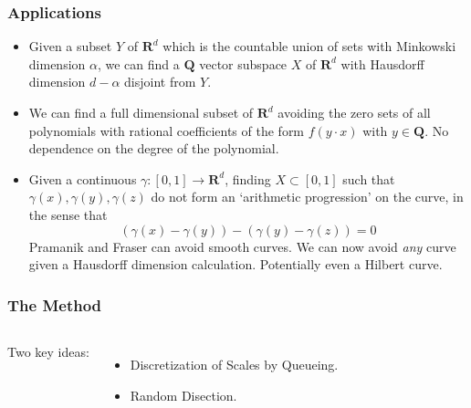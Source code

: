 \documentclass[usenames,dvipsnames]{beamer}
\begin{document}
\begin{frame}
    \frametitle{Applications}

    \begin{itemize}
        \item Given a subset $Y$ of $\mathbf{R}^d$ which is the countable union of sets with Minkowski dimension $\alpha$, we can find a $\mathbf{Q}$ vector subspace $X$ of $\mathbf{R}^d$ with Hausdorff dimension $d - \alpha$ disjoint from $Y$.

        \item We can find a full dimensional subset of $\mathbf{R}^d$ avoiding the zero sets of all polynomials with rational coefficients of the form $f(y \cdot x)$ with $y \in \mathbf{Q}$. No dependence on the degree of the polynomial.

        \item Given a continuous $\gamma: [0,1] \to \mathbf{R}^d$, finding $X \subset [0,1]$ such that $\gamma(x), \gamma(y), \gamma(z)$ do not form an `arithmetic progression' on the curve, in the sense that
        \[ (\gamma(x) - \gamma(y)) - (\gamma(y) - \gamma(z)) = 0 \]
        Pramanik and Fraser can avoid smooth curves. We can now avoid {\it any} curve given a Hausdorff dimension calculation. Potentially even a Hilbert curve.
    \end{itemize}
\end{frame}

\begin{frame}
    \frametitle{The Method}

    \begin{columns}


    {\Huge Two key ideas: }

     \begin{itemize}
        \item {\Large Discretization of Scales by Queueing.}

        \item {\Large Random Disection.}
     \end{itemize}

     \end{columns}
\end{frame}

\end{document}
